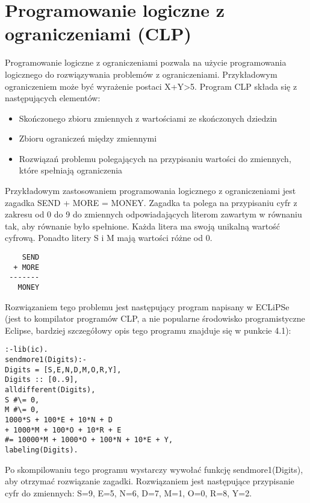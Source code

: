 \chapter{Programowanie logiczne z ograniczeniami (CLP)}

Programowanie logiczne z ograniczeniami\cite{CLP} pozwala na użycie programowania logicznego do rozwiązywania problemów z ograniczeniami. Przykładowym ograniczeniem może być wyrażenie postaci X+Y>5. 
Program CLP składa się z następujących elementów:
\begin{itemize}
\item{Skończonego zbioru zmiennych z wartościami ze skończonych dziedzin}
\item{Zbioru ograniczeń między zmiennymi}
\item{Rozwiązań problemu polegających na przypisaniu wartości do zmiennych, które spełniają ograniczenia}
\end{itemize}
Przykładowym zastosowaniem programowania logicznego z ograniczeniami jest zagadka SEND + MORE  = MONEY.\cite{Eclipse} Zagadka ta polega na przypisaniu cyfr z zakresu od 0 do 9 do zmiennych odpowiadających literom zawartym w równaniu tak, aby równanie było spełnione. Każda litera ma swoją unikalną wartość cyfrową. Ponadto litery S i M mają wartości różne od 0.


\begin{verbatim}
    SEND
  + MORE
 -------
   MONEY
\end{verbatim}
\newpage
Rozwiązaniem tego problemu jest następujący program napisany w ECLiPSe (jest to kompilator programów CLP, a nie popularne środowisko programistyczne Eclipse, bardziej szczegółowy opis tego programu znajduje się w punkcie 4.1):
\begin{verbatim}
:-lib(ic).
sendmore1(Digits):-
Digits = [S,E,N,D,M,O,R,Y],
Digits :: [0..9],
alldifferent(Digits),
S #\= 0,
M #\= 0,
1000*S + 100*E + 10*N + D
+ 1000*M + 100*O + 10*R + E
#= 10000*M + 1000*O + 100*N + 10*E + Y,
labeling(Digits).
\end{verbatim}
Po skompilowaniu tego programu wystarczy wywołać funkcję sendmore1(Digits), aby otrzymać rozwiązanie zagadki. Rozwiązaniem jest następujące przypisanie cyfr do zmiennych: S=9, E=5, N=6, D=7, M=1, O=0, R=8, Y=2. 

